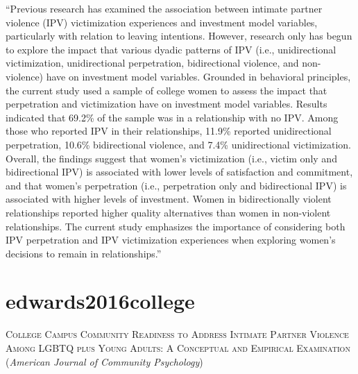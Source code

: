 \documentclass[]{tufte-handout}
\begin{document}
``Previous research has examined the association between intimate
partner violence (IPV) victimization experiences and investment model
variables, particularly with relation to leaving intentions. However,
research only has begun to explore the impact that various dyadic
patterns of IPV (i.e., unidirectional victimization, unidirectional
perpetration, bidirectional violence, and non-violence) have on
investment model variables. Grounded in behavioral principles, the
current study used a sample of college women to assess the impact that
perpetration and victimization have on investment model variables.
Results indicated that 69.2\% of the sample was in a relationship with
no IPV. Among those who reported IPV in their relationships, 11.9\%
reported unidirectional perpetration, 10.6\% bidirectional violence, and
7.4\% unidirectional victimization. Overall, the findings suggest that
women's victimization (i.e., victim only and bidirectional IPV) is
associated with lower levels of satisfaction and commitment, and that
women's perpetration (i.e., perpetration only and bidirectional IPV) is
associated with higher levels of investment. Women in bidirectionally
violent relationships reported higher quality alternatives than women in
non-violent relationships. The current study emphasizes the importance
of considering both IPV perpetration and IPV victimization experiences
when exploring women's decisions to remain in relationships.''

\section{\texorpdfstring{\textcolor[HTML]{5b0057}{edwards2016college}}{}}\label{section-63}

\textsc{\large{College Campus Community Readiness to Address Intimate Partner Violence Among LGBTQ plus Young Adults: A Conceptual and Empirical Examination}}
(\emph{American Journal of Community Psychology})
\end{document}
